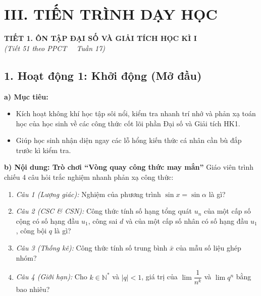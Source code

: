 \documentclass[12pt, a4paper]{article}
\begin{document}
\vspace{5pt}

\section*{III. TIẾN TRÌNH DẠY HỌC}

\begin{center}
    {\fontsize{13pt}{16pt}\selectfont \textbf{TIẾT 1. ÔN TẬP ĐẠI SỐ VÀ GIẢI TÍCH HỌC KÌ I}}\\[2pt]
    \textit{(Tiết 51 theo PPCT \ \textbar \ Tuần 17)}
\end{center}

\subsection*{1. Hoạt động 1: Khởi động (Mở đầu)}

\noindent \textbf{a) Mục tiêu:}
\begin{itemize}[leftmargin=0.6cm]
    \item Kích hoạt không khí học tập sôi nổi, kiểm tra nhanh trí nhớ và phản xạ toán học của học sinh về các công thức cốt lõi phần Đại số và Giải tích HK1.
    \item Giúp học sinh nhận diện ngay các lỗ hổng kiến thức cá nhân cần bù đắp trước kì kiểm tra.
\end{itemize}

\noindent \textbf{b) Nội dung: Trò chơi ``Vòng quay công thức may mắn''}
Giáo viên trình chiếu 4 câu hỏi trắc nghiệm nhanh phản xạ công thức:
\begin{enumerate}
    \item \textit{Câu 1 (Lượng giác):} Nghiệm của phương trình $\sin x = \sin \alpha$ là gì?
    \item \textit{Câu 2 (CSC \& CSN):} Công thức tính số hạng tổng quát $u_n$ của một cấp số cộng có số hạng đầu $u_1$, công sai $d$ và của một cấp số nhân có số hạng đầu $u_1$, công bội $q$ là gì?
    \item \textit{Câu 3 (Thống kê):} Công thức tính số trung bình $\bar{x}$ của mẫu số liệu ghép nhóm?
    \item \textit{Câu 4 (Giới hạn):} Cho $k \in \mathbb{N}^*$ và $|q| < 1$, giá trị của $\lim \dfrac{1}{n^k}$ và $\lim q^n$ bằng bao nhiêu?
\end{enumerate}
\end{document}
